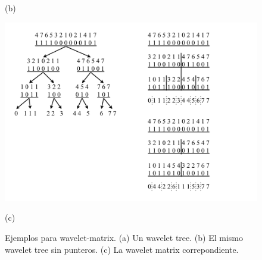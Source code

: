 \begin{figure}
\begin{minipage}{0.3\textwidth}
    		(b)
    	\end{minipage}
    	\begin{minipage}{0.3\textwidth}
    		\centering
    		\includegraphics[scale=.45, clip, trim=470 33 170 317]{img/arte/graphs-wavelet-matrix.pdf}

    		(c)
    	\end{minipage}

    \caption{Ejemplos para wavelet-matrix. (a) Un wavelet tree. (b) El mismo wavelet tree sin punteros. (c) La wavelet matrix correpondiente.}
    \label{fig:wavelet-matrix}
\end{figure}
